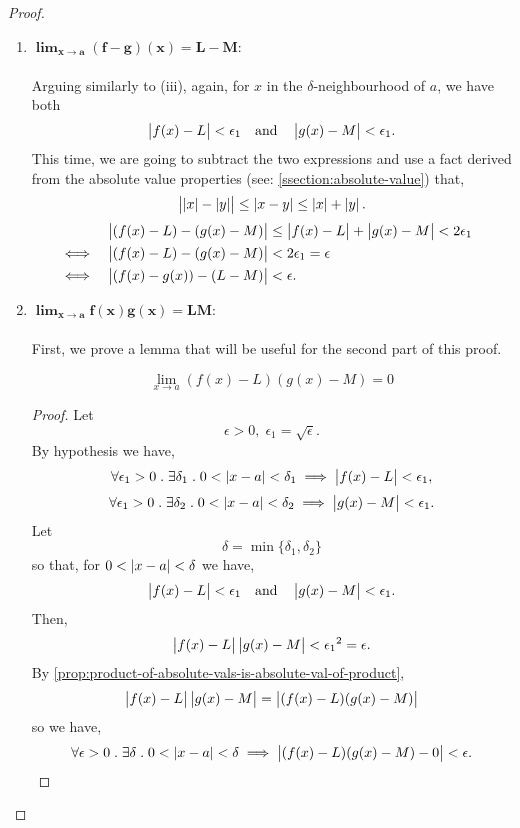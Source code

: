 \documentclass[MathsNotesBase.tex]{subfiles}
\begin{document}
{\begin{proof}
\begin{enumerate}[label=(\roman*)]
{\begin{align*}
					\end{align*}
					\bigskip
				}
				\item{${\bm{ \lim_{x \to a} (f - g)(x) = L - M }}$:\\\\
					Arguing similarly to (iii), again, for $x$ in the $\delta$-neighbourhood of $a$, we have both
					\[ \left\lvert f(x) - L\right\rvert < \epsilon_1 \hspace{10pt}\text{and}\hspace{10pt} \left\lvert g(x) - M\right\rvert < \epsilon_1. \]
					This time, we are going to subtract the two expressions and use a fact derived from the absolute value properties (see: \ref{ssection:absolute-value}) that,
					\[ \left\lvert\left\lvert x\right\rvert - \left\lvert y\right\rvert\right\rvert \leq \left\lvert x - y\right\rvert \leq \left\lvert x\right\rvert + \left\lvert y\right\rvert. \]
					\begin{align*}
					&& \left\lvert(f(x) - L) - (g(x) - M)\right\rvert &\leq \left\lvert f(x) - L\right\rvert + \left\lvert g(x) - M\right\rvert < 2\epsilon_1 \\
					&\iff & \left\lvert(f(x) - L) - (g(x) - M)\right\rvert &<  2\epsilon_1 = \epsilon &\text{\scriptsize{}}\\
					&\iff & \left\lvert(f(x) - g(x)) - (L - M)\right\rvert &<  \epsilon. &\text{\scriptsize{}}
					\end{align*}
					\bigskip
				}
				\item{${\bm{ \lim_{x \to a} f(x)g(x) = LM }}$:\\\\
					First, we prove a lemma that will be useful for the second part of this proof.
					\begin{lemma}
						\[ \lim_{x \to a} (f(x) - L)(g(x) - M) = 0 \]
					\end{lemma}
					\begin{proof}
						Let 
						\[ \epsilon > 0,\; \epsilon_1 = \sqrt{\epsilon}.\]
						By hypothesis we have,
						\[ \forall \epsilon_1 > 0 \;.\; \exists \delta_1 \;.\; 0 < \left\lvert x - a\right\rvert < \delta_1 \implies \left\lvert f(x) - L\right\rvert < \epsilon_1, \]
						\[ \forall \epsilon_1 > 0 \;.\; \exists \delta_2 \;.\; 0 < \left\lvert x - a\right\rvert < \delta_2 \implies \left\lvert g(x) - M\right\rvert < \epsilon_1. \]
						Let 
						\[ \delta = \min \{\delta_1,\delta_2\} \]
						so that, for ${ 0 < \left\lvert x - a\right\rvert < \delta }$ we have,
						\[  \left\lvert f(x) - L\right\rvert < \epsilon_1 \hspace{10pt}\text{and}\hspace{10pt} \left\lvert g(x) - M\right\rvert < \epsilon_1. \]
						Then,
						\[ \left\lvert f(x) - L\right\rvert\left\lvert g(x) - M\right\rvert < {\epsilon_1}^2 = \epsilon. \]
						By \autoref{prop:product-of-absolute-vals-is-absolute-val-of-product},
						\[ \left\lvert f(x) - L\right\rvert\left\lvert g(x) - M\right\rvert = \left\lvert(f(x) - L)(g(x) - M)\right\rvert \]
						so we have,
						\[ \forall \epsilon > 0 \;.\; \exists \delta \;.\; 0 < \left\lvert x - a\right\rvert < \delta \implies \left\lvert(f(x) - L)(g(x) - M) - 0\right\rvert < \epsilon. \]

\end{proof}}
\end{enumerate}
\end{proof}}
\end{document}
